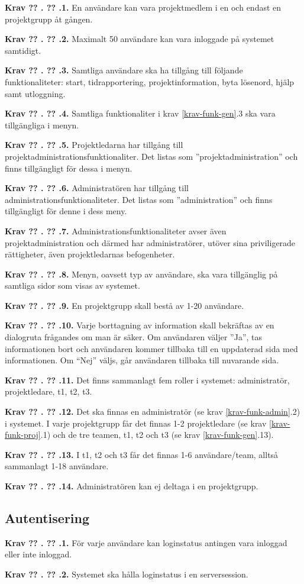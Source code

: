 \documentclass[a4paper]{article}
\newcommand\getcurrentref[1]{%
 \ifnumequal{\value{#1}}{0}
  {??}
  {\the\value{#1}}%
}
\newcommand\requirement[2]{
	\numberedrow{Krav}{#1}{#2}
}
\newcommand\numberedrow[3]{
	\noindent
	\textbf{#1 \getcurrentref{section}.\getcurrentref{subsection}.#2.} #3
	
}
\begin{document}
\requirement{1}{En användare kan vara projektmedlem i en och endast en projektgrupp åt gången.}
\requirement{2}{Maximalt 50 användare kan vara inloggade på systemet samtidigt.}
\requirement{3}{Samtliga användare ska ha tillgång till följande funktionaliteter: start, tidrapportering, projektinformation, byta lösenord, hjälp samt utloggning.}
\requirement{4}{Samtliga funktionaliter i krav \ref{krav-funk-gen}.3 ska vara tillgängliga i menyn.}
\requirement{5}{Projektledarna har tillgång till projektadministrationsfunktionaliter. Det listas som ''projektadministration'' och finns tillgängligt för dessa i menyn.}
\requirement{6}{Administratören har tillgång till administrationsfunktionaliteter. Det listas som ''administration'' och finns tillgängligt för denne i dess meny.}
\requirement{7}{Administrationsfunktionaliteter avser även projektadministration och därmed har administratörer, utöver sina priviligerade rättigheter, även projektledarnas befogenheter.}
\requirement{8}{Menyn, oavsett typ av användare, ska vara tillgänglig på samtliga sidor som visas av systemet.}
\requirement{9}{En projektgrupp skall bestå av 1-20 användare.}
\requirement{10}{Varje borttagning av information skall bekräftas av en dialogruta frågandes om man är säker. Om användaren väljer ''Ja'', tas informationen bort och användaren kommer tillbaka till en uppdaterad sida med informationen. Om ``Nej'' väljs, går användaren tillbaka till nuvarande sida.}
\requirement{11}{Det finns sammanlagt fem roller i systemet: administratör, projektledare, t1, t2, t3.}
\requirement{12}{Det ska finnas en administratör (se krav \ref{krav-funk-admin}.2) i systemet. I varje projektgrupp får det finnas 1-2 projektledare (se krav \ref{krav-funk-proj}.1) och de tre teamen, t1, t2 och t3 (se krav \ref{krav-funk-gen}.13).}
\requirement{13}{I t1, t2 och t3 får det finnas 1-6 användare/team, alltså sammanlagt 1-18 användare.}
\requirement{14}{Administratören kan ej deltaga i en projektgrupp.}


\subsection{Autentisering}
\label{krav-funk-aut}
\requirement{1}{För varje användare kan loginstatus antingen vara inloggad eller inte inloggad.}
\requirement{2}{Systemet ska hålla loginstatus i en serversession.}

\end{document}
